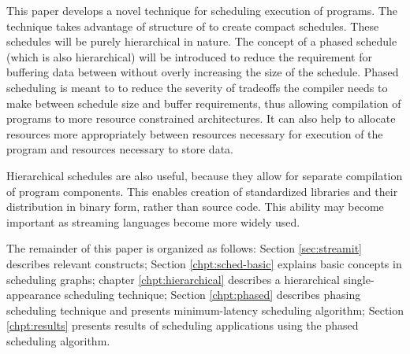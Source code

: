 \begin{comment}
This problem is further complicated by message latency constraints
placed on the program by the programmer.  While {\StreamIt}
programs are meant to provide relatively lax latency requirements,
it is possible to write programs with latency constraints so tight
that very few valid schedules exist. Finding these schedules is a
challenging task.
\end{comment}

This paper develops a novel technique for scheduling execution of
{\StreamIt} programs. The technique takes advantage of structure
of {\StreamIt} to create compact schedules. These schedules will
be purely hierarchical in nature. The concept of a phased schedule
(which is also hierarchical) will be introduced to reduce the
requirement for buffering data between {\filters} without overly
increasing the size of the schedule. Phased scheduling is meant to
to reduce the severity of tradeoffs the compiler needs to make
between schedule size and buffer requirements, thus allowing
compilation of programs to more resource constrained
architectures. It can also help to allocate resources more
appropriately between resources necessary for execution of the
program and resources necessary to store data.

Hierarchical schedules are also useful, because they allow for
separate compilation of program components. This enables creation
of standardized libraries and their distribution in binary form,
rather than source code. This ability may become important as
streaming languages become more widely used.

\begin{comment}
The contributions of this thesis are:
\begin{itemize} \item
hierarchical scheduling of streaming application, a concept
enabled by {\StreamIt} language, \item first formal handling of
{\SDF} graphs with peeking, \item novel phasing scheduling
technique, \item a minimal latency schedule using hierarchical
phases, \item novel {\SDF} program abstraction called the
information buffering model that simplifies information latency
analysis, \item a solution to scheduling of {\StreamIt} programs
with latency constraints.
\end{itemize}
\end{comment}

The remainder of this paper is organized as follows: Section
\ref{sec:streamit} describes relevant {\StreamIt} constructs;
Section \ref{chpt:sched-basic} explains basic concepts in
scheduling {\StreamIt} graphs; chapter \ref{chpt:hierarchical}
describes a hierarchical single-appearance scheduling technique;
Section \ref{chpt:phased} describes phasing scheduling technique
and presents minimum-latency scheduling algorithm; Section
\ref{chpt:results} presents results of scheduling applications
using the phased scheduling algorithm.

